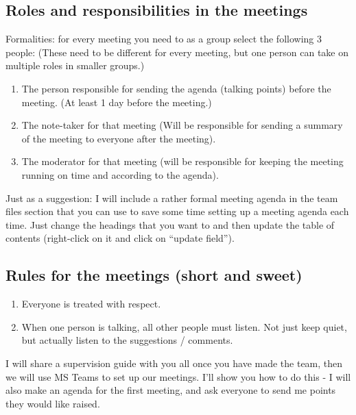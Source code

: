 \documentclass[
]{book}
\begin{document}
\hypertarget{roles-and-responsibilities-in-the-meetings}{%
\subsection{Roles and responsibilities in the meetings}\label{roles-and-responsibilities-in-the-meetings}}

Formalities: for every meeting you need to as a group select the following 3 people:
(These need to be different for every meeting, but one person can take on multiple roles in smaller groups.)

\begin{enumerate}
\def\labelenumi{\arabic{enumi}.}
\item
  The person responsible for sending the agenda (talking points) before the meeting. (At least 1 day before the meeting.)
\item
  The note-taker for that meeting (Will be responsible for sending a summary of the meeting to everyone after the meeting).
\item
  The moderator for that meeting (will be responsible for keeping the meeting running on time and according to the agenda).
\end{enumerate}

Just as a suggestion: I will include a rather formal meeting agenda in the team files section that you can use to save some time setting up a meeting agenda each time. Just change the headings that you want to and then update the table of contents (right-click on it and click on ``update field'').

\hypertarget{rules-for-the-meetings-short-and-sweet}{%
\subsection{Rules for the meetings (short and sweet)}\label{rules-for-the-meetings-short-and-sweet}}

\begin{enumerate}
\def\labelenumi{\arabic{enumi}.}
\item
  Everyone is treated with respect.
\item
  When one person is talking, all other people must listen. Not just keep quiet, but actually listen to the suggestions / comments.
\end{enumerate}

I will share a supervision guide with you all once you have made the team, then we will use MS Teams to set up our meetings. I'll show you how to do this - I will also make an agenda for the first meeting, and ask everyone to send me points they would like raised.
\end{document}
